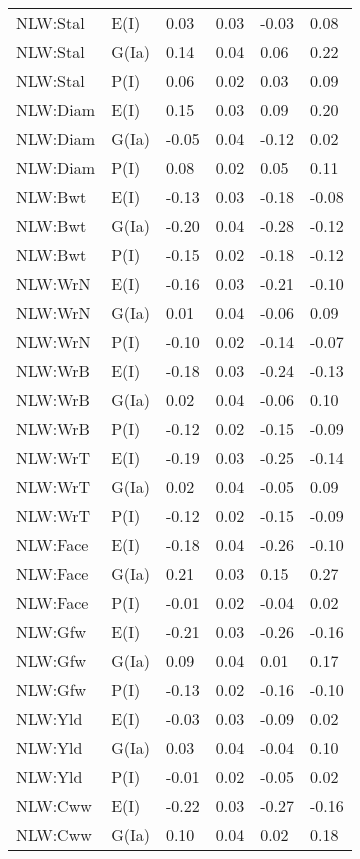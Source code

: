 \begin{center}
\begin{longtable}{|p{1.1in}|p{0.7in}|p{0.7in}|p{0.6in}|p{0.6in}|p{0.6in}|}
  NLW:Stal & E(I) & 0.03 & 0.03 & -0.03 & 0.08 \\ 
  NLW:Stal & G(Ia) & 0.14 & 0.04 & 0.06 & 0.22 \\ 
  NLW:Stal & P(I) & 0.06 & 0.02 & 0.03 & 0.09 \\ 
  NLW:Diam & E(I) & 0.15 & 0.03 & 0.09 & 0.20 \\ 
  NLW:Diam & G(Ia) & -0.05 & 0.04 & -0.12 & 0.02 \\ 
  NLW:Diam & P(I) & 0.08 & 0.02 & 0.05 & 0.11 \\ 
  NLW:Bwt & E(I) & -0.13 & 0.03 & -0.18 & -0.08 \\ 
  NLW:Bwt & G(Ia) & -0.20 & 0.04 & -0.28 & -0.12 \\ 
  NLW:Bwt & P(I) & -0.15 & 0.02 & -0.18 & -0.12 \\ 
  NLW:WrN & E(I) & -0.16 & 0.03 & -0.21 & -0.10 \\ 
  NLW:WrN & G(Ia) & 0.01 & 0.04 & -0.06 & 0.09 \\ 
  NLW:WrN & P(I) & -0.10 & 0.02 & -0.14 & -0.07 \\ 
  NLW:WrB & E(I) & -0.18 & 0.03 & -0.24 & -0.13 \\ 
  NLW:WrB & G(Ia) & 0.02 & 0.04 & -0.06 & 0.10 \\ 
  NLW:WrB & P(I) & -0.12 & 0.02 & -0.15 & -0.09 \\ 
  NLW:WrT & E(I) & -0.19 & 0.03 & -0.25 & -0.14 \\ 
  NLW:WrT & G(Ia) & 0.02 & 0.04 & -0.05 & 0.09 \\ 
  NLW:WrT & P(I) & -0.12 & 0.02 & -0.15 & -0.09 \\ 
  NLW:Face & E(I) & -0.18 & 0.04 & -0.26 & -0.10 \\ 
  NLW:Face & G(Ia) & 0.21 & 0.03 & 0.15 & 0.27 \\ 
  NLW:Face & P(I) & -0.01 & 0.02 & -0.04 & 0.02 \\ 
  NLW:Gfw & E(I) & -0.21 & 0.03 & -0.26 & -0.16 \\ 
  NLW:Gfw & G(Ia) & 0.09 & 0.04 & 0.01 & 0.17 \\ 
  NLW:Gfw & P(I) & -0.13 & 0.02 & -0.16 & -0.10 \\ 
  NLW:Yld & E(I) & -0.03 & 0.03 & -0.09 & 0.02 \\ 
  NLW:Yld & G(Ia) & 0.03 & 0.04 & -0.04 & 0.10 \\ 
  NLW:Yld & P(I) & -0.01 & 0.02 & -0.05 & 0.02 \\ 
  NLW:Cww & E(I) & -0.22 & 0.03 & -0.27 & -0.16 \\ 
  NLW:Cww & G(Ia) & 0.10 & 0.04 & 0.02 & 0.18 \\ 

\end{longtable}
\end{center}
